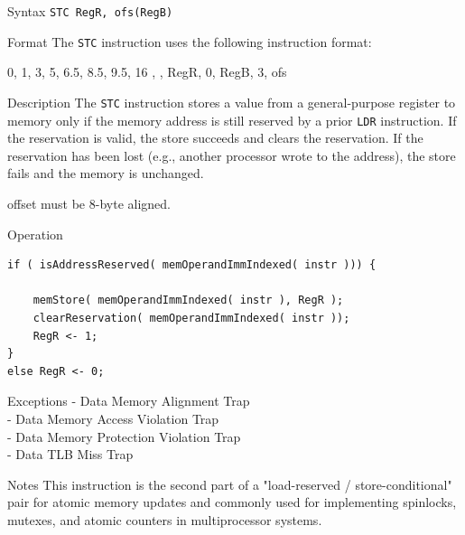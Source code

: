 %
%
\pagebreak
{}

\begin{iPageDescEntry}{Syntax}
  \texttt{STC RegR, ofs(RegB)}
\end{iPageDescEntry}

\begin{iPageDescEntry}{Format}
    The \texttt{STC} instruction uses the following instruction format: \\

    \begin{flushleft}
    \drawInstrFormat
        {0, 1, 3, 5, 6.5, 8.5, 9.5, 16}
        {\OpCodeGrpMEM, \OpCodeSTC, RegR, 0, RegB, 3, ofs}
    \end{flushleft}
\end{iPageDescEntry}

\begin{iPageDescEntry}{Description}
    The \texttt{STC} instruction stores a value from a general-purpose register to memory only if the memory address is still reserved by a prior \texttt{LDR} instruction. If the reservation is valid, the store succeeds and clears the reservation. If the reservation has been lost (e.g., another processor wrote to the address), the store fails and the memory is unchanged.
    
    offset must be 8-byte aligned.
\end{iPageDescEntry}

\begin{iPageDescOpEntry}{Operation}
\begin{lstlisting}[style=iPageOpStyle]
if ( isAddressReserved( memOperandImmIndexed( instr ))) {

    memStore( memOperandImmIndexed( instr ), RegR );
    clearReservation( memOperandImmIndexed( instr ));
    RegR <- 1;
}
else RegR <- 0;
\end{lstlisting}
\end{iPageDescOpEntry}

\begin{iPageDescEntry}{Exceptions}
    - Data Memory Alignment Trap \\
    - Data Memory Access Violation Trap \\
    - Data Memory Protection Violation Trap \\
    - Data TLB Miss Trap
\end{iPageDescEntry}

\begin{iPageDescEntry}{Notes}
    This instruction is the second part of a "load-reserved / store-conditional" pair for atomic memory updates and commonly used for implementing spinlocks, mutexes, and atomic counters in multiprocessor systems.
\end{iPageDescEntry}




